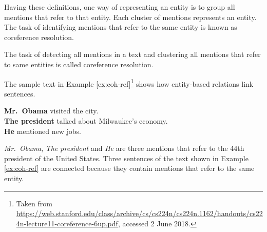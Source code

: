 Having these definitions, one way of representing an entity is to group all mentions that refer to that entity. 
Each cluster of mentions 
represents an entity. 
The task of identifying mentions that refer to the same entity is known as coreference resolution.   

\begin{definition}
	The task of detecting all mentions in a text and clustering all mentions that refer to same entities is called coreference resolution. 
\end{definition}

 
The sample text in Example \ref{ex:coh-ref}\footnote{Taken from \url{https://web.stanford.edu/class/archive/cs/cs224n/cs224n.1162/handouts/cs224n-lecture11-coreference-6up.pdf}, accessed 2 June 2018.} shows how entity-based relations link sentences. 

\begin{examples}
	\label{ex:coh-ref}
	\textbf{Mr.\ Obama} visited the city. \\
	\textbf{The president} talked about Milwaukee’s economy. \\
	\textbf{He} mentioned new jobs. \\
\end{examples} 

\emph{Mr.\ Obama}, \emph{The president} and \emph{He} are three mentions that refer to the 44th president of the United States. 
Three sentences of the text shown in Example \ref{ex:coh-ref} are connected because they contain mentions that refer to the same entity. 

